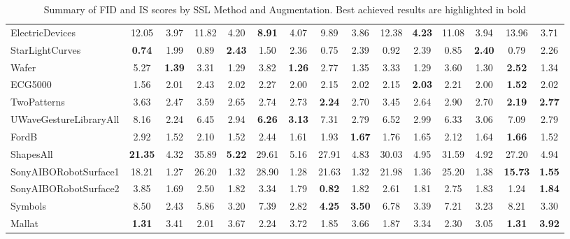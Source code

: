 \documentclass[../../thesis.tex]{subfiles}
\begin{document}
\begin{table}[H]
\begin{adjustbox}{width=\textwidth}
\begin{tabular}{lcc|cc|cc|cc|cc|cc|cc}
        ElectricDevices         & 12.05 & 3.97 & 11.82 & 4.20 & \textbf{8.91} & 4.07 & 9.89 & 3.86 & 12.38 & \textbf{4.23} & 11.08 & 3.94 & 13.96 & 3.71 \\
        StarLightCurves         & \textbf{0.74} & 1.99 & 0.89 & \textbf{2.43} & 1.50 & 2.36 & 0.75 & 2.39 & 0.92 & 2.39 & 0.85 & \textbf{2.40} & 0.79 & 2.26 \\
        Wafer                   & 5.27 & \textbf{1.39} & 3.31 & 1.29 & 3.82 & \textbf{1.26} & 2.77 & 1.35 & 3.33 & 1.29 & 3.60 & 1.30 & \textbf{2.52} & 1.34 \\
        ECG5000                 & 1.56 & 2.01 & 2.43 & 2.02 & 2.27 & 2.00 & 2.15 & 2.02 & 2.15 & \textbf{2.03} & 2.21 & 2.00 & \textbf{1.52} & 2.02 \\
        TwoPatterns             & 3.63 & 2.47 & 3.59 & 2.65 & 2.74 & 2.73 & \textbf{2.24} & 2.70 & 3.45 & 2.64 & 2.90 & 2.70 & \textbf{2.19} & \textbf{2.77} \\
        UWaveGestureLibraryAll  & 8.16 & 2.24 & 6.45 & 2.94 & \textbf{6.26} & \textbf{3.13} & 7.31 & 2.79 & 6.52 & 2.99 & 6.33 & 3.06 & 7.09 & 2.79 \\
        FordB                   & 2.92 & 1.52 & 2.10 & 1.52 & 2.44 & 1.61 & 1.93 & \textbf{1.67} & 1.76 & 1.65  & 2.12 & 1.64 & \textbf{1.66} & 1.52 \\
        ShapesAll               & \textbf{21.35} & 4.32 & 35.89 & \textbf{5.22} & 29.61 & 5.16 & 27.91 & 4.83 & 30.03 & 4.95 & 31.59 & 4.92 & 27.20 & 4.94 \\
        SonyAIBORobotSurface1   & 18.21 & 1.27 & 26.20 & 1.32 & 28.90 & 1.28 & 21.63 & 1.32 & 21.98 & 1.36 & 25.20 & 1.38 & \textbf{15.73} & \textbf{1.55} \\
        SonyAIBORobotSurface2   & 3.85 & 1.69 & 2.50 & 1.82 & 3.34 & 1.79 & \textbf{0.82} & 1.82 & 2.61 & 1.81 & 2.75 & 1.83 & 1.24 & \textbf{1.84} \\
        Symbols                  & 8.50 & 2.43 & 5.86 & 3.20 & 7.39 & 2.82 & \textbf{4.25} & \textbf{3.50} & 6.78 & 3.39 & 7.21 & 3.23 & 8.21 & 3.30 \\
        Mallat                   & \textbf{1.31} & 3.41 & 2.01 & 3.67 & 2.24 & 3.72 & 1.85 & 3.66 & 1.87 & 3.34 & 2.30 & 3.05 & \textbf{1.31} & \textbf{3.92} \\
        \bottomrule
    \end{tabular}
    \end{adjustbox}
    \caption{Summary of FID and IS scores by SSL Method and Augmentation. Best achieved results are highlighted in bold}
    \label{tab:FID_IS_best}
\end{table}
\end{document}
